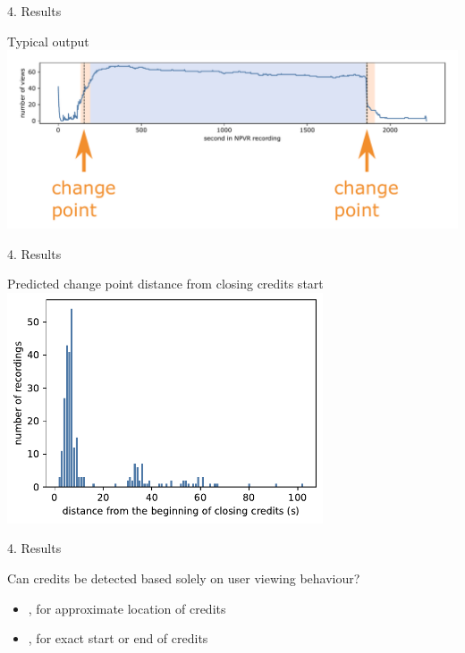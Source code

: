\documentclass[first=orange,second=blue,logo=blueque]{aaltoslides}
\begin{document}

\begin{frame}{4. Results}
    \begin{block}{{\color{black}Typical output}}
        \center
        \includegraphics[width=1\textwidth]{figures/output1.pdf}
    \end{block}
\end{frame}


\begin{frame}{4. Results}
    \begin{block}{{\color{black}Predicted change point distance from closing credits start}}
        \center
        \includegraphics[width=0.7\textwidth]{figures/result_absolute0.pdf}
    \end{block}
\end{frame}


\begin{frame}{4. Results}
    \begin{block}{{\color{black}Can credits be detected based solely on user viewing behaviour?}}
        \begin{itemize}
            \item {\color{aaltoorange}{Yes}}, for approximate location of credits
            \item {\color{aaltoorange}{No}}, for exact start or end of credits
        \end{itemize}
    \end{block}
\end{frame}
\end{document}
